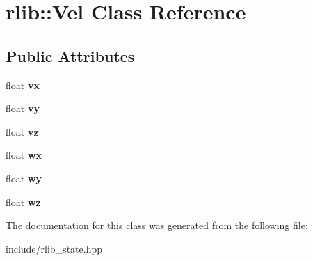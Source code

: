 \hypertarget{classrlib_1_1Vel}{\section{rlib\-:\-:Vel Class Reference}
\label{classrlib_1_1Vel}
}
\subsection*{Public Attributes}
\begin{DoxyCompactItemize}
\item 
\hypertarget{classrlib_1_1Vel_aba9035c6e774edd37f2421ec376bb8f3}{float {\bfseries vx}}\label{classrlib_1_1Vel_aba9035c6e774edd37f2421ec376bb8f3}

\item 
\hypertarget{classrlib_1_1Vel_acb4d80d6a58e1813359f9931d2fc6c9e}{float {\bfseries vy}}\label{classrlib_1_1Vel_acb4d80d6a58e1813359f9931d2fc6c9e}

\item 
\hypertarget{classrlib_1_1Vel_aab3819a2079bb4654939da51cf896af3}{float {\bfseries vz}}\label{classrlib_1_1Vel_aab3819a2079bb4654939da51cf896af3}

\item 
\hypertarget{classrlib_1_1Vel_adc2bc037dd0c69f0aaa972a41b8af55c}{float {\bfseries wx}}\label{classrlib_1_1Vel_adc2bc037dd0c69f0aaa972a41b8af55c}

\item 
\hypertarget{classrlib_1_1Vel_a40c6bb36dcb99cd88214e92c8169e7b1}{float {\bfseries wy}}\label{classrlib_1_1Vel_a40c6bb36dcb99cd88214e92c8169e7b1}

\item 
\hypertarget{classrlib_1_1Vel_a7f1cf4b7d0dba121ec54d0011eb1e4d5}{float {\bfseries wz}}\label{classrlib_1_1Vel_a7f1cf4b7d0dba121ec54d0011eb1e4d5}

\end{DoxyCompactItemize}


The documentation for this class was generated from the following file\-:\begin{DoxyCompactItemize}
\item 
include/rlib\-\_\-state.\-hpp\end{DoxyCompactItemize}
